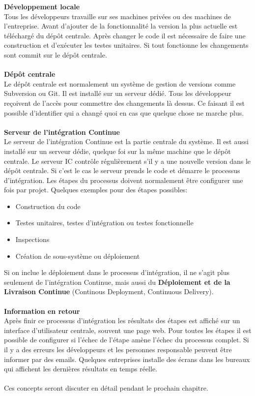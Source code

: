 \textbf{Développement locale}\\
Tous les développeurs travaille sur ses machines privées ou des machines de l'entreprise. Avant d'ajouter de la fonctionnalité la version la plus actuelle est téléchargé du dépôt centrale. Après changer le code il est nécessaire de faire une construction et d'exécuter les testes unitaires. Si tout fonctionne les changements sont commit sur le dépôt centrale.\\\\
\textbf{Dépôt centrale}\\
Le dépôt centrale est normalement un système de gestion de versions comme Subversion ou Git. Il est installé sur un serveur dédié. Tous les développeur reçoivent de l'accès pour commettre des changements là dessus. Ce faisant il est possible d'identifier qui a changé quoi en cas que quelque chose ne marche plus.\\\\
\textbf{Serveur de l'intégration Continue} \\
Le serveur de l'intégration Continue est la partie centrale du système. Il est aussi installé sur un serveur dédie, quelque foi sur la même machine que le dépôt centrale. Le serveur IC contrôle régulièrement s'il y a une nouvelle version dans le dépôt centrale. Si c'est le cas le serveur prends le code et démarre le processus d'intégration. Les étapes du processus doivent normalement être configurer une fois par projet. Quelques exemples pour des étapes possibles:
\begin{itemize}
\item Construction du code
\item Testes unitaires, testes d'intégration ou testes fonctionnelle
\item Inspections
\item Création de sous-système ou déploiement
\end{itemize}
Si on inclue le déploiement dans le processus d'intégration, il ne s'agit plus seulement de l'intégration Continue, mais aussi du \textbf{Déploiement et de la Livraison Continue} (Continous Deployment, Continuous Delivery). 
\\\\
\textbf{Information en retour}\\
Après finir ce processus d'intégration les résultats des étapes est affiché sur un interface d'utilisateur centrale, souvent une page web. Pour toutes les étapes il est possible de configurer si l'échec de l'étape amène l'échec du processus complet. Si il y a des erreurs les développeurs et les personnes responsable peuvent être informer par des emails. Quelques entreprises installe des écrans dans les bureaux qui affichent les dernières résultats en temps réelle.\\\\
Ces concepts seront discuter en détail pendant le prochain chapitre.
